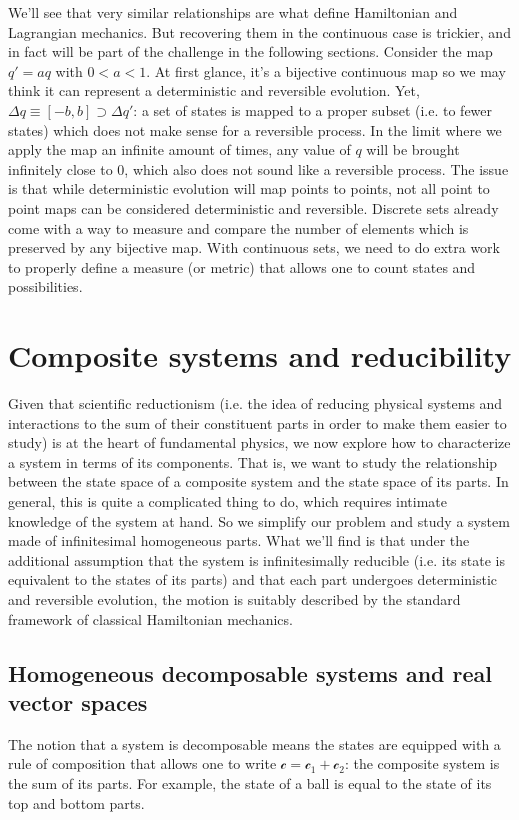 \documentclass[aps,pra,10pt,twocolumn,floatfix,nofootinbib]{revtex4-1}
\numberwithin{equation}{section}
\theoremstyle{definition}
\begin{document}
We'll see that very similar relationships are what define Hamiltonian and Lagrangian mechanics. But recovering them in the continuous case is trickier, and in fact will be part of the challenge in the following sections. Consider the map $q'=aq$ with $0<a<1$. At first glance, it's a bijective continuous map so we may think it can represent a deterministic and reversible evolution. Yet, $\Delta q \equiv [-b, b] \supset \Delta q'$: a set of states is mapped to a proper subset (i.e. to fewer states) which does not make sense for a reversible process. In the limit where we apply the map an infinite amount of times, any value of $q$ will be brought infinitely close to $0$, which also does not sound like a reversible process. The issue is that while deterministic evolution will map points to points, not all point to point maps can be considered deterministic and reversible. Discrete sets already come with a way to measure and compare the number of elements which is preserved by any bijective map. With continuous sets, we need to do extra work to properly define a measure (or metric) that allows one to count states and possibilities.

\section{Composite systems and reducibility}
\label{sec:reducibility}


Given that scientific reductionism (i.e. the idea of reducing physical systems and interactions to the sum of their constituent parts in order to make them easier to study) is at the heart of fundamental physics, we now explore how to characterize a system in terms of its components. That is, we want to study the relationship between the state space of a composite system and the state space of its parts. In general, this is quite a complicated thing to do, which requires intimate knowledge of the system at hand. So we simplify our problem and study a system made of infinitesimal homogeneous parts. What we'll find is that under the additional assumption that the system is infinitesimally reducible (i.e. its state is equivalent to the states of its parts) and that each part undergoes deterministic and reversible evolution, the motion is suitably described by the standard framework of classical Hamiltonian mechanics.

\subsection{Homogeneous decomposable systems and real vector spaces}
The notion that a system is decomposable means the states are equipped with a rule of composition that allows one to write $\mathcal{c}=\mathcal{c}_1+\mathcal{c}_2$: the composite system is the sum of its parts. For example, the state of a ball is equal to the state of its top and bottom parts.
\end{document}
